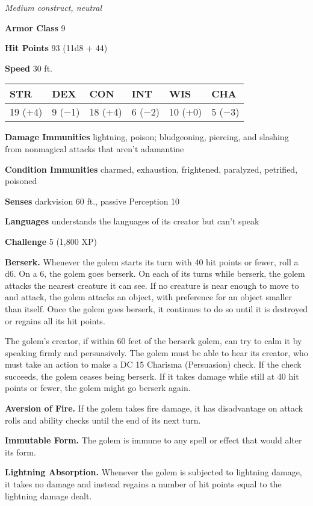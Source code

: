 \documentclass[
]{article}
\begin{document}
\emph{Medium construct, neutral}

\textbf{Armor Class} 9

\textbf{Hit Points} 93 (11d8 + 44)

\textbf{Speed} 30 ft.

\begin{longtable}[]{@{}llllll@{}}
\toprule
STR & DEX & CON & INT & WIS & CHA\tabularnewline
\midrule
\endhead
19 (+4) & 9 (−1) & 18 (+4) & 6 (−2) & 10 (+0) & 5 (−3)\tabularnewline
\bottomrule
\end{longtable}

\textbf{Damage Immunities} lightning, poison; bludgeoning, piercing, and
slashing from nonmagical attacks that aren't adamantine

\textbf{Condition Immunities} charmed, exhaustion, frightened,
paralyzed, petrified, poisoned

\textbf{Senses} darkvision 60 ft., passive Perception 10

\textbf{Languages} understands the languages of its creator but can't
speak

\textbf{Challenge} 5 (1,800 XP)

\textbf{Berserk.} Whenever the golem starts its turn with 40 hit points
or fewer, roll a d6. On a 6, the golem goes berserk. On each of its
turns while berserk, the golem attacks the nearest creature it can see.
If no creature is near enough to move to and attack, the golem attacks
an object, with preference for an object smaller than itself. Once the
golem goes berserk, it continues to do so until it is destroyed or
regains all its hit points.

The golem's creator, if within 60 feet of the berserk golem, can try to
calm it by speaking firmly and persuasively. The golem must be able to
hear its creator, who must take an action to make a DC 15 Charisma
(Persuasion) check. If the check succeeds, the golem ceases being
berserk. If it takes damage while still at 40 hit points or fewer, the
golem might go berserk again.

\textbf{Aversion of Fire.} If the golem takes fire damage, it has
disadvantage on attack rolls and ability checks until the end of its
next turn.

\textbf{Immutable Form.} The golem is immune to any spell or effect that
would alter its form.

\textbf{Lightning Absorption.} Whenever the golem is subjected to
lightning damage, it takes no damage and instead regains a number of hit
points equal to the lightning damage dealt.
\end{document}
